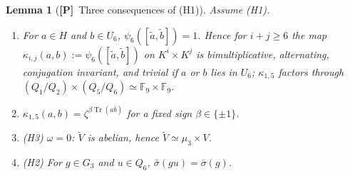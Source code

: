 \documentclass[11pt]{article}
\newcommand{\Fq}{\mathbb F}
\newcommand{\Tr}{\operatorname{Tr}}
\newcommand{\tV}{\widetilde V}
\newcommand{\Ptag}{\textnormal{\textbf{[P]}}}
\theoremstyle{plain}
\newtheorem{lemma}[theorem]{Lemma}
\theoremstyle{definition}
\begin{document}
\begin{lemma}[\Ptag\ Three consequences of (H1)]\label{lem:H1consequences}
Assume (H1).
\begin{enumerate}[label=(\alph*)]
\item For $a\in H$ and $b\in U_6$, $\psi_6([\tilde a,\tilde b])=1$.  Hence for
$i+j\ge6$ the map $\kappa_{i,j}(a,b):=\psi_6([\tilde a,\tilde b])$ on
$K^i\times K^j$ is bimultiplicative, alternating, conjugation
invariant, and trivial if $a$ or $b$ lies in $U_6$; $\kappa_{1,5}$
factors through $(Q_1/Q_2)\times(Q_5/Q_6)\simeq\Fq_9\times\Fq_9$.
\item $\kappa_{1,5}(a,b)=\zeta^{\beta\Tr(a\bar b)}$ for a fixed sign
$\beta\in\{\pm1\}$.
\item (H3) $\omega=0$: $\tV$ is abelian, hence $\tV\simeq\mu_3\times V$.
\item (H2) For $g\in G_3$ and $u\in Q_6$, $\bar\sigma(gu)=\bar\sigma(g)$.
\end{enumerate}
\end{lemma}
\end{document}
